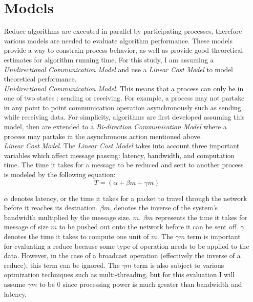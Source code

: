 \documentclass{article}
\begin{document}
\section{Models}

Reduce algorithms are executed in parallel by participating processes, therefore various models are
needed to evaluate algorithm performance. These models provide a way to constrain process behavior, as
well as provide good theoretical estimates for algorithm running time. For this study, I am assuming
a \textit{Unidirectional Communication Model} and use a \textit{Linear Cost Model} to model 
theoretical performance. \\

\textit{Unidirectional Communication Model}. This means that a process can only be in one of two 
states
: sending or receiving. For example, a process may not partake in any point to point communication
operation asynchronously such as sending while receiving data. For simplicity, algorithms are first
developed assuming this model, then are extended to a \textit{Bi-direction Communication Model} 
where a process may partake in the asynchronous action mentioned above. \\ 

\textit{Linear Cost Model}. The \textit{Linear Cost Model} takes into account three important 
variables which affect message passing: latency, bandwidth, and computation time. The time it takes
for a message to be reduced and sent to another process is modeled by the following equation:
$$T = (\alpha + \beta m + \gamma m)$$

\noindent $\alpha$ denotes latency, or the time it takes for a packet to travel through the network before
it reaches its destnation. $\beta m$, denotes the inverse of the system's bandwidth multiplied by
the message size, $m$. $\beta m$ represents the time it takes for message of size $m$ to be pushed
out onto the network before it can be sent off. $\gamma$ denotes the time it takes to compute one 
unit of $m$. The $\gamma m$ term is important for evaluating a reduce because some type of operation
needs to be applied to the data. However, in the case of a broadcast operation (effectively the
inverse of a reduce), this term can be ignored. The $\gamma m$ term is also subject to various 
optmization techniques such as multi-threading, but for this evaluation I will assume $\gamma m$ to
be 0 since processing power is much greater than bandwidth and latency. \\
\end{document}
